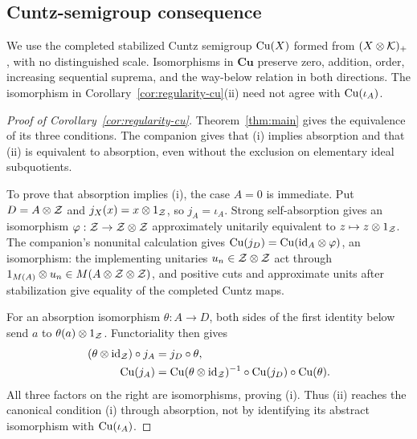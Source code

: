 \subsection{Cuntz-semigroup consequence}
\label{subsec:cu-consequence}

We use the completed stabilized Cuntz semigroup $\mathrm{Cu}(X)$ formed from
$(X\otimes\mathcal K)_+$, with no distinguished scale. Isomorphisms in
$\mathbf{Cu}$ preserve zero, addition, order, increasing sequential
suprema, and the way-below relation in both directions. The isomorphism
in Corollary~\ref{cor:regularity-cu}\textup{(ii)} need not agree with
$\mathrm{Cu}(\iota_A)$.

\begin{proof}[Proof of Corollary~\ref{cor:regularity-cu}]
Theorem~\ref{thm:main} gives the equivalence of its three conditions.
The companion \cite[Corollaries~1.3 and~1.4]{CuntzCompanion} gives
that \textup{(i)} implies absorption and that \textup{(ii)} is equivalent
to absorption, even without the exclusion on elementary ideal subquotients.

To prove that absorption implies \textup{(i)}, the case $A=0$ is immediate.
Put $D=A\otimes\mathcal Z$ and $j_X(x)=x\otimes1_\mathcal Z$, so $j_A=\iota_A$.
Strong self-absorption gives an isomorphism
$\varphi:\mathcal Z\to\mathcal Z\otimes\mathcal Z$ approximately unitarily equivalent to
$z\mapsto z\otimes1_\mathcal Z$. The companion's nonunital calculation
\cite[proof of Corollary~1.4]{CuntzCompanion} gives
$\mathrm{Cu}(j_D)=\mathrm{Cu}(\mathrm{id}_A\otimes\varphi)$, an isomorphism: the implementing
unitaries $u_n\in\mathcal Z\otimes\mathcal Z$ act through
$1_{M(A)}\otimes u_n\in M(A\otimes\mathcal Z\otimes\mathcal Z)$, and positive cuts
and approximate units after stabilization give equality of the completed
Cuntz maps.

For an absorption isomorphism $\theta:A\to D$, both sides of the first
identity below send $a$ to $\theta(a)\otimes1_\mathcal Z$. Functoriality then gives
\[
\begin{aligned}
 (\theta\otimes\mathrm{id}_\mathcal Z)\circ j_A&=j_D\circ\theta,\\
 \mathrm{Cu}(j_A)&=\mathrm{Cu}(\theta\otimes\mathrm{id}_\mathcal Z)^{-1}
       \circ\mathrm{Cu}(j_D)\circ\mathrm{Cu}(\theta).
\end{aligned}
\]
All three factors on the right are isomorphisms, proving \textup{(i)}.
Thus \textup{(ii)} reaches the canonical condition \textup{(i)} through
absorption, not by identifying its abstract isomorphism with $\mathrm{Cu}(\iota_A)$.
\end{proof}
